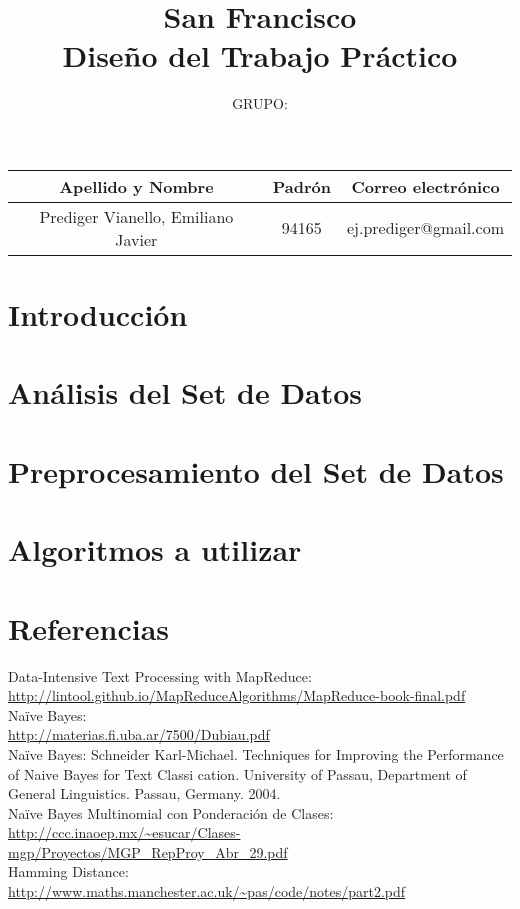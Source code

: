 \documentclass[a4paper,10pt]{article}
\title{San Francisco\\
Diseño del Trabajo Práctico\\}
\date{}
\author{GRUPO: \\}
\begin{document}
	\maketitle

	\begin{table}[h!]
	  \centering
	  \begin{tabular}{ccc}
		\toprule
		Apellido y Nombre & Padr\'on & Correo electr\'onico	\\
		\midrule
		Prediger Vianello, Emiliano Javier	& 94165 & ej.prediger@gmail.com\\
		\bottomrule
	  \end{tabular}
	\end{table}

\newpage
	\tableofcontents

\newpage

	\section{Introducción}

	\section{Análisis del Set de Datos}

	\section{Preprocesamiento del Set de Datos}

	\section{Algoritmos a utilizar}
		
	\section{Referencias}
	
Data-Intensive Text Processing with MapReduce:\\
\url{http://lintool.github.io/MapReduceAlgorithms/MapReduce-book-final.pdf}\\
Naïve Bayes: \\
\url{http://materias.fi.uba.ar/7500/Dubiau.pdf}\\
Naïve Bayes: Schneider Karl-Michael. Techniques for Improving the Performance of Naive Bayes for Text Classi cation. University of Passau, Department of General Linguistics. Passau, Germany. 2004.\\
Naïve Bayes Multinomial con Ponderación de Clases:\\
\url{http://ccc.inaoep.mx/~esucar/Clases-mgp/Proyectos/MGP_RepProy_Abr_29.pdf}\\
Hamming Distance:\\
\url{http://www.maths.manchester.ac.uk/~pas/code/notes/part2.pdf}\\
	
\end{document}
